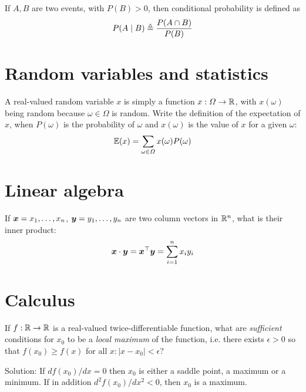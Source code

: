 \documentclass[a4paper]{article}
\def\solution {1}
\begin{document}
\begin{exercise}
  If $A, B$ are two events, with $P(B) > 0$, then conditional probability is defined as
  \[
  P(A \mid B) \defn 
  \ifdefined \solution
  \frac{P(A \cap B)}{P(B)}
  \else
  \ldots
  \fi
  \]
\end{exercise}


\section{Random variables and statistics}


\begin{exercise}
  A real-valued random variable $x$ is simply a function
  $x : \Omega \to {\mathbb{R}}$, with $x(\omega)$ being random because
  $\omega \in \Omega$ is random.  Write the definition of the
  expectation of $x$, when $P(\omega)$ is the probability of $\omega$ and
  $x(\omega)$ is the value of $x$ for a given $\omega$:
  \[
  \E(x) = 
  \ifdefined \solution
  \sum_{\omega \in \Omega} x(\omega) P(\omega) 
  \else
  \ldots
  \fi
  \]
\end{exercise}



\section{Linear algebra}

\begin{exercise}
  If $\bx = x_1, \ldots, x_n$, $\by = y_1, \ldots, y_n$ are two column vectors in ${\mathbb{R}}^n$, what is their inner product:
  \[
  \bx \cdot \by = \bx^\top \by = 
  \ifdefined \solution
  \sum_{i=1}^n x_i y_i
  \fi
  \]
\end{exercise}


\section{Calculus}

\begin{exercise}
  If $f : {\mathbb{R}} \to {\mathbb{R}}$ is a real-valued twice-differentiable function, what are \emph{sufficient} conditions for $x_0$ to be a \emph{local maximum} of the function, i.e. there exists $\epsilon > 0$ so that $f(x_0) \geq f(x)$ for all $x : |x - x_0| < \epsilon$?
\end{exercise}
\ifdefined\solution
Solution: If $d f(x_0) /dx  = 0$ then
$x_0$ is either a saddle point, a maximum or a minimum. If in addition $d^2 f(x_0) /dx^2 < 0$, then $x_0$ is a maximum.
\fi
\end{document}
